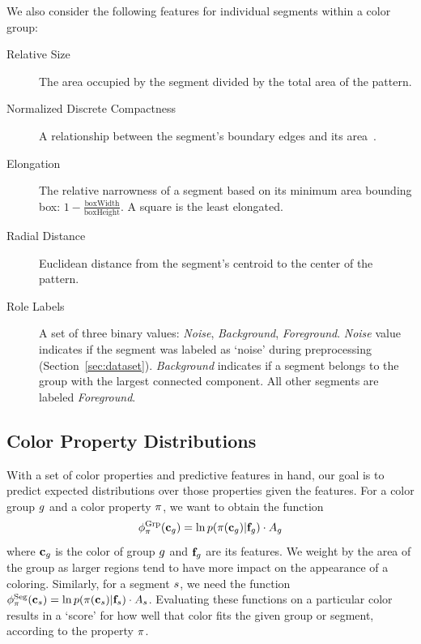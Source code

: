 We also consider the following features for individual segments within a color group:
\begin{description}
	\item[Relative Size] The area occupied by the segment divided by the total area of the pattern.
  \item[Normalized Discrete Compactness] A relationship between the segment's boundary edges and its area~\cite{NormalizedDiscreteCompactness}.
  \item[Elongation] The relative narrowness of a segment based on its minimum area bounding box: $1-\frac{\textrm{boxWidth}}{\textrm{boxHeight}}$. A square is the least elongated.
  \item[Radial Distance] Euclidean distance from the segment's centroid to the center of the pattern.
  \item[Role Labels] A set of three binary values: {\emph{Noise}, \emph{Background}, \emph{Foreground}}. \emph{Noise} value indicates if the segment was labeled as `noise' during preprocessing (Section~\ref{sec:dataset}). \emph{Background} indicates if a segment belongs to the group with the largest connected component. All other segments are labeled \emph{Foreground}.
\end{description}

\subsection{Color Property Distributions}
\label{sec:unaryDistribs}

With a set of color properties and predictive features in hand, our goal is to predict expected distributions over those properties given the features. For a color group $g$ and a color property $\pi$, we want to obtain the function
\begin{equation*}
\phi^{\textrm{Grp}}_\pi(\mathbf{c}_g) =  \ln p( \pi( \mathbf{c}_g ) | \mathbf{f}_g ) \cdot A_g
\end{equation*}
where $\mathbf{c}_g$ is the color of group $g$ and $\mathbf{f}_g$ are its features. We weight by the area of the group as larger regions tend to have more impact on the appearance of a coloring. Similarly, for a segment $s$, we need the function $\phi^{\textrm{Seg}}_\pi(\mathbf{c}_s) = \ln p( \pi( \mathbf{c}_s ) | \mathbf{f}_s) \cdot A_s$. Evaluating these functions on a particular color results in a `score' for how well that color fits the given group or segment, according to the property $\pi$.

